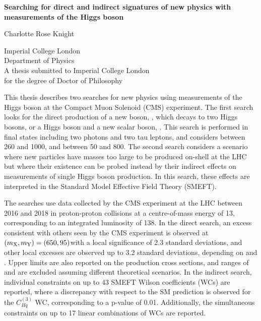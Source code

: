 \begin{titlepage}
  \begin{center}
      \vspace*{2cm}
      
      \huge{\textbf{Searching for direct and indirect signatures of new physics with measurements of the Higgs boson}}

      \vspace{1.5cm}
      \normalsize
      Charlotte Rose Knight
      
      \vspace{0.5cm}
      Imperial College London\\
      Department of Physics\\

      \vspace{5cm}
      A thesis submitted to Imperial College London\\
      for the degree of Doctor of Philosophy\\
      
  \end{center}
\end{titlepage}



This thesis describes two searches for new physics using measurements of the Higgs boson at the Compact Muon Solenoid (CMS) experiment. The first search looks for the direct production of a new boson, \PX, which decays to two Higgs bosons, or a Higgs boson and a new scalar boson, \PY. This search is performed in final states including two photons and two tau leptons, and considers \mX between 260 and 1000\GeV, and \mY between 50 and 800\GeV. The second search considers a scenario where new particles have masses too large to be produced on-shell at the LHC but where their existence can be probed instead by their indirect effects on measurements of single Higgs boson production. In this search, these effects are interpreted in the Standard Model Effective Field Theory (SMEFT).

The searches use data collected by the CMS experiment at the LHC between 2016 and 2018 in proton-proton collisions at a centre-of-mass energy of 13\TeV, corresponding to an integrated luminosity of 138\fbinv. In the direct search, an excess consistent with others seen by the CMS experiment is observed at $(m_{\mathrm{X}}, m_{\mathrm{Y}}) = (650, 95)$\GeV with a local significance of 2.3 standard deviations, and other local excesses are observed up to 3.2 standard deviations, depending on \mX and \mY. Upper limits are also reported on the production cross sections, and ranges of \mX and \mY are excluded assuming different theoretical scenarios. In the indirect search, individual constraints on up to 43 SMEFT Wilson coefficients (WCs) are reported, where a discrepancy with respect to the SM prediction is observed for the $C_{Hq}^{(3)}$ WC, corresponding to a p-value of 0.01. Additionally, the simultaneous constraints on up to 17 linear combinations of WCs are reported.

